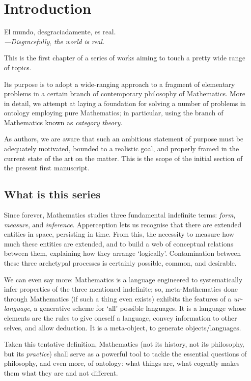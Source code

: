 \section{Introduction}\label{sec_intro}
\epigraph{El mundo, desgraciadamente, es real.\\[2mm]
\footnotesize\emph{---Disgracefully, the world is real.}
}{\cite{confutacion}}
This is the first chapter of a series of works aiming to touch a pretty wide range of topics.

Its purpose is to adopt a wide-ranging approach to a fragment of elementary problems in a certain branch of contemporary philosophy of Mathematics. More in detail, we attempt at laying a foundation for solving a number of problems in ontology employing pure Mathematics; in particular, using the branch of Mathematics known as \emph{category theory}.

As authors, we are aware that such an ambitious statement of purpose must be adequately motivated, bounded to a realistic goal, and properly framed in the current state of the art on the matter. This is the scope of the initial section of the present first manuscript.
\subsection{What is this series}
Since forever, Mathematics studies three fundamental indefinite terms: \emph{form}, \emph{measure}, and \emph{inference}. Apperception lets us recognise that there are extended entities in space, persisting in time. From this, the necessity to measure how much these entities are extended, and to build a web of conceptual relations between them, explaining how they arrange `logically'.
Contamination between these three archetypal processes is certainly possible, common, and desirable.

We can even say more: Mathematics is a language engineered to systematically infer properties of the three mentioned indefinite; so, meta\hyp{}Mathematics done through Mathematics (if such a thing even exists) exhibits the features of a \emph{ur-language}, a generative scheme for `all' possible languages. It is a language whose elements are the rules to give oneself a language, convey information to other selves, and allow deduction. It is a meta-object, to generate objects/languages.

Taken this tentative definition, Mathematics (not its history, not its philosophy, but its \emph{practice}) shall serve as a powerful tool to tackle the essential questions of philosophy, and even more, of ontology: what things are, what cogently makes them what they are and not different.

